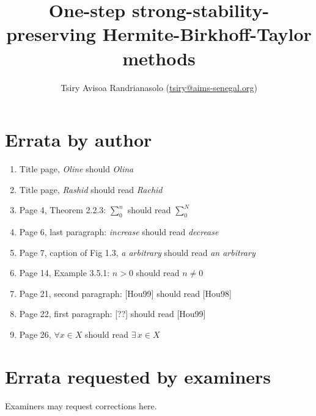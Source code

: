 \documentclass[11pt,a4paper]{article}
\title{One-step strong-stability-preserving Hermite-Birkhoff-Taylor methods}
\author{Tsiry Avisoa Randrianasolo (\href{mailto:tsiry@aims-senegal.org}{tsiry@aims-senegal.org})}
\date{}
\begin{document}
\maketitle
\section{Errata by author}
\begin{enumerate}
 \item Title page, \textit{Oline} should \textit{Olina}
 \item Title page, \textit{Rashid} should read \textit{Rachid}
 \item Page 4, Theorem 2.2.3: $\sum_0^n$ should read $\sum_0^N$
 \item Page 6, last paragraph: \textit{increase} should read \textit{decrease}
 \item Page 7,  caption of Fig 1.3, \textit{a arbitrary} should read \textit{an arbitrary}
 \item Page 14, Example 3.5.1: $n>0$ should read $n\neq0$
 \item Page 21, second paragraph: [Hou99] should read [Hou98]
 \item Page 22, first paragraph: [??] should read [Hou99]
 \item Page 26, $\forall x\in X$ should read $\exists\, x\in X$
\end{enumerate}
\section{Errata requested by examiners}
Examiners may request corrections here.
\end{document}
